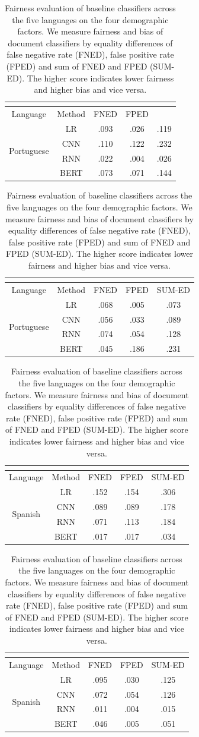 \begin{table}[htp]
\begin{tabular}{cc|ccc}
\multicolumn{5}{c}{} \\\hline\hline
Language & Method & FNED & FPED \\\hline
\multirow{4}{*}{Portuguese} & LR & .093 & .026 & .119\\
 & CNN  & .110 & .122 & .232 \\
 & RNN  & .022 & .004 & .026 \\
 & BERT & .073 & .071 & .144
\end{tabular}
\quad
\begin{tabular}{cc|ccc}
\multicolumn{5}{c}{} \\\hline\hline
Language & Method & FNED & FPED & SUM-ED \\\hline
\multirow{4}{*}{Portuguese} & LR  & .068 & .005 & .073 \\
 & CNN  & .056 & .033 & .089 \\
 & RNN  & .074 & .054 & .128 \\
 & BERT & .045 & .186 & .231
\end{tabular}

\begin{tabular}{cc|ccc}
\multicolumn{5}{c}{} \\\hline\hline
Language & Method & FNED & FPED & SUM-ED \\\hline
\multirow{4}{*}{Spanish} & LR & .152 & .154 & .306\\
 & CNN  & .089 & .089 & .178 \\
 & RNN  & .071 & .113 & .184 \\
 & BERT & .017 & .017 & .034
\end{tabular}
\quad
\begin{tabular}{cc|ccc}
\multicolumn{5}{c}{} \\\hline\hline
Language & Method & FNED & FPED & SUM-ED \\\hline
\multirow{4}{*}{Spanish} & LR & .095 & .030 & .125 \\
 & CNN  & .072 & .054 & .126 \\
 & RNN  & .011 & .004 & .015 \\
 & BERT & .046 & .005 & .051
\end{tabular}
\caption{Fairness evaluation of baseline classifiers across the five languages on the four demographic factors. We measure fairness and bias of document classifiers by equality differences of false negative rate (FNED), false positive rate (FPED) and sum of FNED and FPED (SUM-ED). The higher score indicates lower fairness and higher bias and vice versa.}
\label{chap5:tab:fairness}
\end{table}

